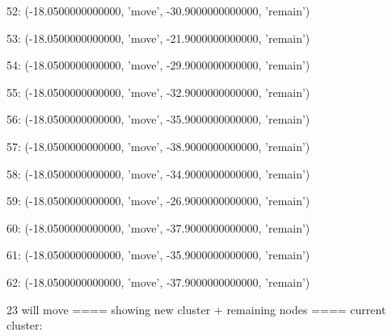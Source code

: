 52: (-18.0500000000000, 'move', -30.9000000000000, 'remain')


53: (-18.0500000000000, 'move', -21.9000000000000, 'remain')


54: (-18.0500000000000, 'move', -29.9000000000000, 'remain')


55: (-18.0500000000000, 'move', -32.9000000000000, 'remain')


56: (-18.0500000000000, 'move', -35.9000000000000, 'remain')


57: (-18.0500000000000, 'move', -38.9000000000000, 'remain')


58: (-18.0500000000000, 'move', -34.9000000000000, 'remain')


59: (-18.0500000000000, 'move', -26.9000000000000, 'remain')


60: (-18.0500000000000, 'move', -37.9000000000000, 'remain')


61: (-18.0500000000000, 'move', -35.9000000000000, 'remain')


62: (-18.0500000000000, 'move', -37.9000000000000, 'remain')


23 will move
==== showing new cluster + remaining nodes ====
current cluster:


